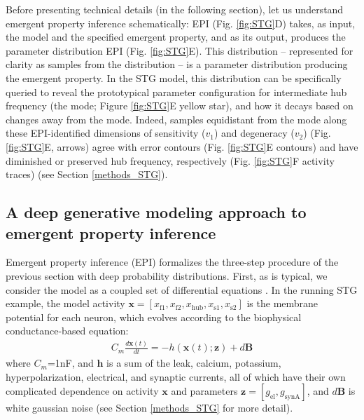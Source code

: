 \documentclass[11pt]{article}
\begin{document}
Before presenting technical details (in the following section), let us understand emergent property inference schematically:  EPI (Fig. \ref{fig:STG}D) takes, as input, the model and the specified emergent property, and as its output, produces the parameter distribution  EPI (Fig. \ref{fig:STG}E).  
This distribution -- represented for clarity as samples from the distribution -- is a parameter distribution producing the emergent property. 
In the STG model, this distribution can be specifically queried to reveal the prototypical parameter configuration for intermediate hub frequency (the mode; Figure \ref{fig:STG}E yellow star), and how it decays based on changes away from the mode.
Indeed, samples equidistant from the mode along these EPI-identified dimensions of sensitivity ($v_1$) and degeneracy ($v_2$) (Fig. \ref{fig:STG}E, arrows) agree with error contours (Fig. \ref{fig:STG}E contours) and have diminished or preserved hub frequency, respectively (Fig. \ref{fig:STG}F activity traces) (see Section \ref{methods_STG}).

\subsection{A deep generative modeling approach to emergent property inference} \label{results_dgm}
Emergent property inference (EPI) formalizes the three-step procedure of the previous section with deep probability distributions.
First, as is typical, we consider the model as a coupled set of differential equations \cite{gutierrez2013multiple}.  
In the running STG example, the model activity $\mathbf{x} = \left[ x_{\text{f1}}, x_{\text{f2}}, x_{\text{hub}}, x_{\text{s1}}, x_{\text{s2}} \right]$ is the membrane potential for each neuron, which evolves according to the biophysical conductance-based equation:
\begin{equation} 
\begin{split}
C_m \frac{d\mathbf{x}(t)}{dt} = -h(\mathbf{x}(t); \mathbf{z}) + d\mathbf{B}
 \end{split}
\end{equation} 
where $C_m$=1nF, and $\mathbf{h}$ is a sum of the leak, calcium, potassium, hyperpolarization, electrical, and synaptic currents, all of which have their own complicated dependence on activity $\mathbf{x}$ and parameters $\mathbf{z} = [g_{\text{el}}, g_{\text{synA}}]$, and $d\mathbf{B}$ is white gaussian noise (see Section \ref{methods_STG} for more detail).
\end{document}
